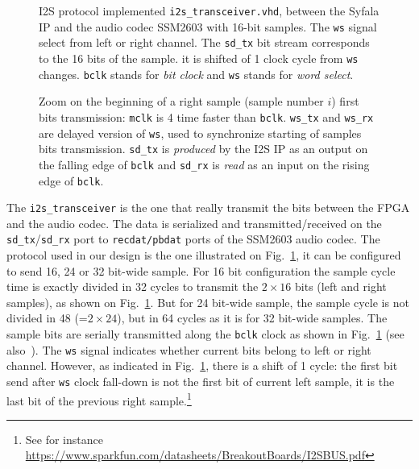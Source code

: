 \documentclass[11pt]{article}
\numberwithin{equation}{section}
\numberwithin{figure}{section}
\begin{document}


\begin{figure}[ht]
  
  \caption{I2S  protocol implemented {\tt i2s\_transceiver.vhd}, between the Syfala IP and  the audio codec SSM2603 with 16-bit samples. The {\tt ws} signal select from left or right channel. The {\tt  sd\_tx} bit stream corresponds to the 16 bits of the sample. it is shifted of 1 clock cycle from {\tt ws} changes. {\tt bclk} stands for {\em bit clock} and {\tt ws} stands for {\em word select}.}
  \label{figi2s}
\end{figure}

\begin{figure}[ht]
  
  \caption{Zoom on the beginning of a right sample  (sample number $i$) first bits transmission: {\tt mclk} is 4 time faster than {\tt bclk}. {\tt ws\_tx} and {\tt ws\_rx} are delayed version of {\tt ws}, used to synchronize starting of  samples bits transmission. {\tt sd\_tx} is {\em produced} by the I2S IP as an output on the falling edge of {\tt bclk} and {\tt sd\_rx} is {\em read} as an input on the rising edge of {\tt bclk}.}
  \label{figi2szoom1}
\end{figure}

The {\tt i2s\_transceiver} is the one that really transmit the bits between the FPGA and the audio codec. The data is serialized and transmitted/received on the {\tt sd\_tx}/{\tt sd\_rx} port to {\tt recdat/pbdat} ports of the SSM2603 audio codec. The protocol used in our design is the one illustrated on Fig.~\ref{figi2s}, it can be configured to send 16, 24 or 32 bit-wide sample. For 16 bit configuration the sample cycle time is exactly divided in 32 cycles to transmit the $2\times16$ bits (left and right samples), as shown on Fig.~\ref{figi2s}. But for 24 bit-wide sample, the sample cycle is not divided in 48 (=$2\times24$), but in 64 cycles as it is for 32  bit-wide samples.  The sample bits are serially transmitted along the {\tt bclk} clock as shown in Fig.~\ref{figi2s} (see also~\cite{ssm2603}). The {\tt ws} signal indicates whether current bits belong to  left or right channel. However, as indicated in Fig.~\ref{figi2s}, there is a shift of 1 cycle: the first bit send after {\tt ws} clock fall-down is not the first bit of current left sample, it is the last bit of the previous right sample.\footnote{See for instance \url{https://www.sparkfun.com/datasheets/BreakoutBoards/I2SBUS.pdf}}
\end{document}
